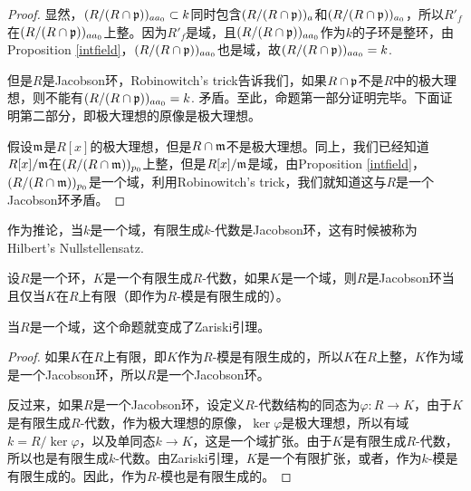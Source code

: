 \begin{proof}
显然，$(R/(R\cap \mathfrak{p}))_{aa_0}\subset k$同时包含$(R/(R\cap \mathfrak{p}))_{a}$和$(R/(R\cap \mathfrak{p}))_{a_0}$，所以$R'_f$在$(R/(R\cap \mathfrak{p}))_{aa_0}$上整。因为$R'_f$是域，且$(R/(R\cap \mathfrak{p}))_{aa_0}$作为$k$的子环是整环，由Proposition \ref{intfield}，$(R/(R\cap \mathfrak{p}))_{aa_0}$也是域，故$(R/(R\cap \mathfrak{p}))_{aa_0}=k$.

但是$R$是Jacobson环，Robinowitch's trick告诉我们，如果$R\cap \mathfrak{p}$不是$R$中的极大理想，则不能有$(R/(R\cap \mathfrak{p}))_{aa_0}=k$. 矛盾。至此，命题第一部分证明完毕。下面证明第二部分，即极大理想的原像是极大理想。

假设$\mathfrak{m}$是$R[x]$的极大理想，但是$R\cap \mathfrak{m}$不是极大理想。同上，我们已经知道$R[x]/\mathfrak{m}$在$(R/(R\cap \mathfrak{m}))_{p_0}$上整，但是$R[x]/\mathfrak{m}$是域，由Proposition \ref{intfield}，$(R/(R\cap \mathfrak{m}))_{p_0}$是一个域，利用Robinowitch's trick，我们就知道这与$R$是一个Jacobson环矛盾。\end{proof}

作为推论，当$k$是一个域，有限生成$k$-代数是Jacobson环，这有时候被称为Hilbert's Nullstellensatz.

\begin{pro}
设$R$是一个环，$K$是一个有限生成$R$-代数，如果$K$是一个域，则$R$是Jacobson环当且仅当$K$在$R$上有限（即作为$R$-模是有限生成的）。
\end{pro}

当$R$是一个域，这个命题就变成了Zariski引理。

\begin{proof} 如果$K$在$R$上有限，即$K$作为$R$-模是有限生成的，所以$K$在$R$上整，$K$作为域是一个Jacobson环，所以$R$是一个Jacobson环。

反过来，如果$R$是一个Jacobson环，设定义$R$-代数结构的同态为$\varphi:R\to K$，由于$K$是有限生成$R$-代数，作为极大理想的原像，$\ker\varphi$是极大理想，所以有域$k=R/\ker\varphi$，以及单同态$k\to K$，这是一个域扩张。由于$K$是有限生成$R$-代数，所以也是有限生成$k$-代数。由Zariski引理，$K$是一个有限扩张，或者，作为$k$-模是有限生成的。因此，作为$R$-模也是有限生成的。\end{proof}

